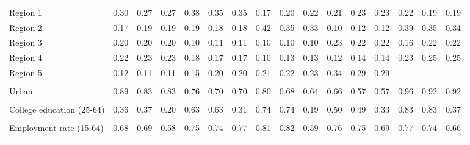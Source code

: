 \begin{tabular}{l*{15}{c}}
\\
Region 1 & 0.30 & 0.27 & 0.27 & 0.38 & 0.35 & 0.35 & 0.17 & 0.20 & 0.22 & 0.21 & 0.23 & 0.23 & 0.22 & 0.19 & 0.19 \\
Region 2 & 0.17 & 0.19 & 0.19 & 0.19 & 0.18 & 0.18 & 0.42 & 0.35 & 0.33 & 0.10 & 0.12 & 0.12 & 0.39 & 0.35 & 0.34 \\
Region 3 & 0.20 & 0.20 & 0.20 & 0.10 & 0.11 & 0.11 & 0.10 & 0.10 & 0.10 & 0.23 & 0.22 & 0.22 & 0.16 & 0.22 & 0.22 \\
Region 4 & 0.22 & 0.23 & 0.23 & 0.18 & 0.17 & 0.17 & 0.10 & 0.13 & 0.13 & 0.12 & 0.14 & 0.14 & 0.23 & 0.25 & 0.25 \\
Region 5 & 0.12 & 0.11 & 0.11 & 0.15 & 0.20 & 0.20 & 0.21 & 0.22 & 0.23 & 0.34 & 0.29 & 0.29 & & & \\
\\
Urban & 0.89 & 0.83 & 0.83 & 0.76 & 0.70 & 0.70 & 0.80 & 0.68 & 0.64 & 0.66 & 0.57 & 0.57 & 0.96 & 0.92 & 0.92 \\
\\
College education (25-64) & 0.36 & 0.37 & 0.20 & 0.63 & 0.63 & 0.31 & 0.74 & 0.74 & 0.19 & 0.50 & 0.49 & 0.33 & 0.83 & 0.83 & 0.37 \\
\\
Employment rate (15-64) & 0.68 & 0.69 & 0.58 & 0.75 & 0.74 & 0.77 & 0.81 & 0.82 & 0.59 & 0.76 & 0.75 & 0.69 & 0.77 & 0.74 & 0.66 \\
\\
\bottomrule
\end{tabular}
